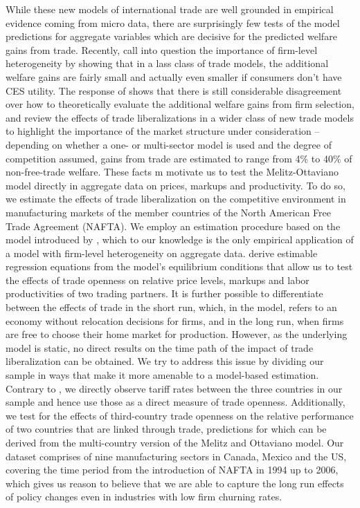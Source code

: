 \documentclass[a4paper,12pt]{article}
\begin{document}
While these new models of international trade are well grounded in empirical evidence coming from micro data, there are surprisingly few tests of the model predictions for aggregate variables which are decisive for the predicted welfare gains from trade. Recently, \citet{Arkolakisetal2012a,Arkolakisetal2012b} call into question the importance of firm-level heterogeneity by showing that in a lass class of trade models, the additional welfare gains are fairly small and actually even smaller if consumers don't have CES utility. The response of \citet{MelitzRedding2013} shows that there is still considerable disagreement over how to theoretically evaluate the additional welfare gains from firm selection, and \citet{CostinotRodriguez2014} review the effects of trade liberalizations in a wider class of new trade models to highlight the importance of the market structure under consideration -- depending on whether a one- or multi-sector model is used and the degree of competition assumed, gains from trade are estimated to range from 4\% to 40\% of non-free-trade welfare. These facts m motivate us to test the Melitz-Ottaviano model directly in aggregate data on prices, markups and productivity. To do so, we estimate the effects of trade liberalization on the competitive environment in manufacturing markets of the member countries of the North American Free Trade Agreement (NAFTA). We employ an estimation procedure based on the \citet{MelitzOttaviano2008} model introduced by \citet{Chen2009}, which to our knowledge is the only empirical application of a model with firm-level heterogeneity on aggregate data. \citet{Chen2009} derive estimable regression equations from the model's equilibrium conditions that allow us to test the effects of trade openness on relative price levels, markups and labor productivities of two trading partners. It is further possible to differentiate between the effects of trade in the short run, which, in the model, refers to an economy without relocation decisions for firms, and in the long run, when firms are free to choose their home market for production. However, as the underlying model is static, no direct results on the time path of the impact of trade liberalization can be obtained. We try to address this issue by dividing our sample in ways that make it more amenable to a model-based estimation. Contrary to \citet{Chen2009}, we directly observe tariff rates between the three countries in our sample and hence use those as a direct measure of trade openness. Additionally, we test for the effects of third-country trade openness on the relative performance of two countries that are linked through trade, predictions for which can be derived from the multi-country version of the Melitz and Ottaviano model. Our dataset comprises of nine manufacturing sectors in Canada, Mexico and the US, covering the time period from the introduction of NAFTA in 1994 up to 2006, which gives us reason to believe that we are able to capture the long run effects of policy changes even in industries with low firm churning rates. \\
\end{document}
